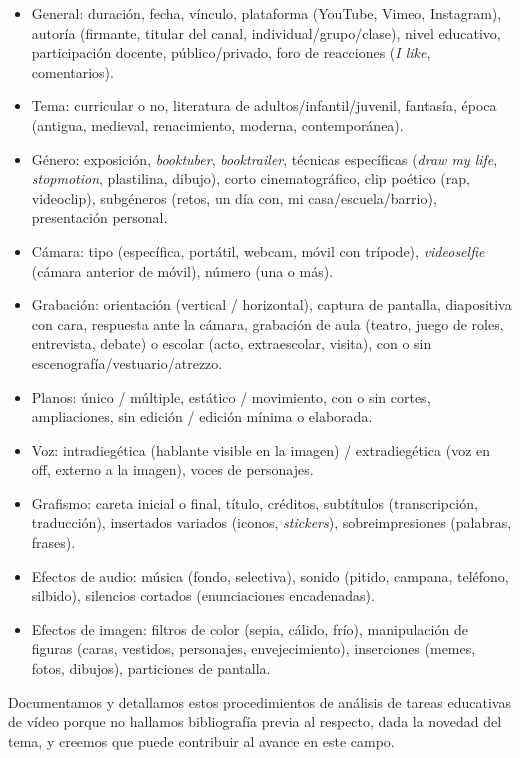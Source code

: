 \documentclass[spanish]{textolivre}
\begin{document}
\begin{itemize}
 \item General: duración, fecha, vínculo, plataforma (YouTube, Vimeo, Instagram), autoría (firmante, titular del canal, individual/grupo/clase), nivel educativo, participación docente, público/privado, foro de reacciones (\textit{I like}, comentarios).
 \item Tema: curricular o no, literatura de adultos/infantil/juvenil, fantasía, época (antigua, medieval, renacimiento, moderna, contemporánea).
 \item Género: exposición, \textit{booktuber}, \textit{booktrailer}, técnicas específicas (\textit{draw my life}, \textit{stopmotion}, plastilina, dibujo), corto cinematográfico, clip poético (rap, videoclip), subgéneros (retos, un día con, mi casa/escuela/barrio), presentación personal.
 \item Cámara: tipo (específica, portátil, webcam, móvil con trípode), \textit{videoselfie} (cámara anterior de móvil), número (una o más).
 \item Grabación: orientación (vertical / horizontal), captura de pantalla, diapositiva con cara, respuesta ante la cámara, grabación de aula (teatro, juego de roles, entrevista, debate) o escolar (acto, extraescolar, visita), con o sin escenografía/vestuario/atrezzo.
 \item Planos: único / múltiple, estático / movimiento, con o sin cortes, ampliaciones, sin edición / edición mínima o elaborada.
 \item Voz: intradiegética (hablante visible en la imagen) / extradiegética (voz en off, externo a la imagen), voces de personajes.
 \item Grafismo: careta inicial o final, título, créditos, subtítulos (transcripción, traducción), insertados variados (iconos, \textit{stickers}), sobreimpresiones (palabras, frases).
 \item Efectos de audio: música (fondo, selectiva), sonido (pitido, campana, teléfono, silbido), silencios cortados (enunciaciones encadenadas).
 \item Efectos de imagen: filtros de color (sepia, cálido, frío), manipulación de figuras (caras, vestidos, personajes, envejecimiento), inserciones (memes, fotos, dibujos), particiones de pantalla.
\end{itemize}

Documentamos y detallamos estos procedimientos de análisis de tareas educativas de vídeo porque no hallamos bibliografía previa al respecto, dada la novedad del tema, y creemos que puede contribuir al avance en este campo.
\end{document}
